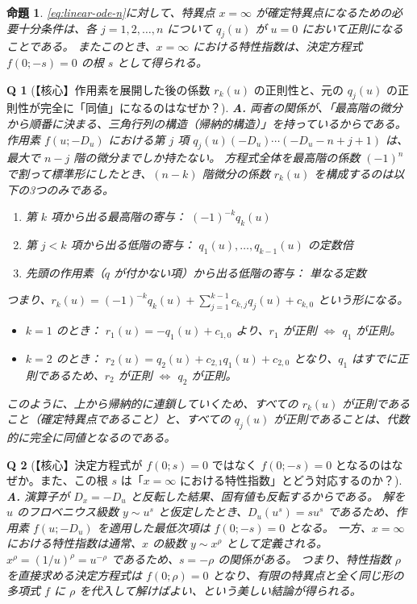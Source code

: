 \documentclass[paper=a4, fontsize=11pt]{jlreq} %
\theoremstyle{break}
\newtheorem{proposition}[theorem]{命題}
\theoremstyle{qa}
\newtheorem*{Q}{Q}
\theoremstyle{remark} %
\begin{document}
\begin{proposition}\label{prop:infinity_fuchs_q}
\eqref{eq:linear-ode-n}に対して、特異点 $x=\infty$ が確定特異点になるための必要十分条件は、各 $j = 1, 2, \dots, n$ について $q_{j}(u)$ が $u=0$ において正則になることである。
またこのとき、$x=\infty$ における特性指数は、決定方程式 $f(0; -s) = 0$ の根 $s$ として得られる。
\end{proposition}

\begin{Q}[【核心】作用素を展開した後の係数 $r_{k}(u)$ の正則性と、元の $q_{j}(u)$ の正則性が完全に「同値」になるのはなぜか？]
\textbf{A.} 両者の関係が、「最高階の微分から順番に決まる、三角行列の構造（帰納的構造）」を持っているからである。
作用素 $f(u; -D_{u})$ における第 $j$ 項 $q_{j}(u) (-D_{u})\cdots(-D_{u}-n+j+1)$ は、最大で $n-j$ 階の微分までしか持たない。
方程式全体を最高階の係数 $(-1)^{n}$ で割って標準形にしたとき、$(n-k)$ 階微分の係数 $r_{k}(u)$ を構成するのは以下の3つのみである。
\begin{enumerate}
    \item 第 $k$ 項から出る最高階の寄与： $(-1)^{-k} q_{k}(u)$
    \item 第 $j < k$ 項から出る低階の寄与： $q_{1}(u), \dots, q_{k-1}(u)$ の定数倍
    \item 先頭の作用素（$q$ が付かない項）から出る低階の寄与： 単なる定数
\end{enumerate}
つまり、$r_{k}(u) = (-1)^{-k} q_{k}(u) + \sum_{j=1}^{k-1} c_{k,j} q_{j}(u) + c_{k,0}$ という形になる。
\begin{itemize}
    \item $k=1$ のとき： $r_{1}(u) = -q_{1}(u) + c_{1,0}$ より、$r_{1}$ が正則 $\iff$ $q_{1}$ が正則。
    \item $k=2$ のとき： $r_{2}(u) = q_{2}(u) + c_{2,1}q_{1}(u) + c_{2,0}$ となり、$q_{1}$ はすでに正則であるため、$r_{2}$ が正則 $\iff$ $q_{2}$ が正則。
\end{itemize}
このように、上から帰納的に連鎖していくため、すべての $r_{k}(u)$ が正則であること（確定特異点であること）と、すべての $q_{j}(u)$ が正則であることは、代数的に完全に同値となるのである。
\end{Q}

\begin{Q}[【核心】決定方程式が $f(0; s)=0$ ではなく $f(0; -s)=0$ となるのはなぜか。また、この根 $s$ は「$x=\infty$ における特性指数」とどう対応するのか？]
\textbf{A.} 演算子が $D_{x} = -D_{u}$ と反転した結果、固有値も反転するからである。
解を $u$ のフロベニウス級数 $y \sim u^{s}$ と仮定したとき、$D_{u} (u^{s}) = s u^{s}$ であるため、作用素 $f(u; -D_{u})$ を適用した最低次項は $f(0; -s) = 0$ となる。
一方、$x=\infty$ における特性指数は通常、$x$ の級数 $y \sim x^{\rho}$ として定義される。$x^{\rho} = (1/u)^{\rho} = u^{-\rho}$ であるため、$s = -\rho$ の関係がある。
つまり、特性指数 $\rho$ を直接求める決定方程式は $f(0; \rho) = 0$ となり、有限の特異点と全く同じ形の多項式 $f$ に $\rho$ を代入して解けばよい、という美しい結論が得られる。
\end{Q}
\end{document}
